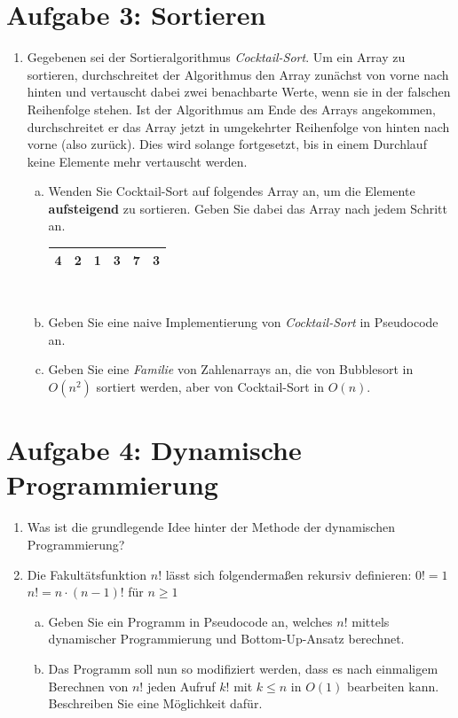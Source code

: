 \documentclass{scrartcl}
\begin{document}
\section*{Aufgabe 3: Sortieren}
\begin{enumerate}[(1)]
\item Gegebenen sei der Sortieralgorithmus \emph{Cocktail-Sort}. Um ein Array zu sortieren, durchschreitet der Algorithmus den Array zun\"achst von vorne nach hinten und vertauscht dabei zwei benachbarte Werte, wenn sie in der falschen Reihenfolge stehen. Ist der Algorithmus am Ende des Arrays angekommen, durchschreitet er das Array jetzt in umgekehrter Reihenfolge von hinten nach vorne (also \glqq zur\"uck\grqq). Dies wird solange fortgesetzt, bis in einem Durchlauf keine Elemente mehr vertauscht werden.
\begin{enumerate}[(a)]
\item Wenden Sie Cocktail-Sort auf folgendes Array an, um die Elemente \textbf{aufsteigend} zu sortieren. Geben Sie dabei das Array nach jedem Schritt an.
\\
\begin{center}
\begin{tabular}{|c|c|c|c|c|c|}
\hline
4 & 2 & 1 & 3 & 7 & 3 \\
\hline
\end{tabular}
\end{center}
\text{ } \\
\item Geben Sie eine naive Implementierung von \emph{Cocktail-Sort} in Pseudocode an.
\item Geben Sie eine \emph{Familie} von Zahlenarrays an, die von Bubblesort in $O(n^2)$ sortiert werden, aber von Cocktail-Sort in $O(n)$.
\end{enumerate}
\end{enumerate}

\section*{Aufgabe 4: Dynamische Programmierung}
\begin{enumerate}[(1)]

\item Was ist die grundlegende Idee hinter der Methode der dynamischen Programmierung?

\item Die Fakultätsfunktion $n!$ lässt sich folgendermaßen rekursiv definieren: \newline
$0! = 1$\newline
$n! = n\cdot(n-1)!$ 	für $n \geq 1$
\begin{enumerate}[(a)]
\item Geben Sie ein Programm in Pseudocode an, welches $n!$  mittels dynamischer Programmierung und Bottom-Up-Ansatz berechnet.
\item Das Programm soll nun so modifiziert werden, dass es nach einmaligem Berechnen von $n!$ jeden Aufruf $k!$ mit $k \leq n$ in $O(1)$ bearbeiten kann. Beschreiben Sie eine Möglichkeit dafür.
\end{enumerate}
\end{enumerate}
\end{document}
